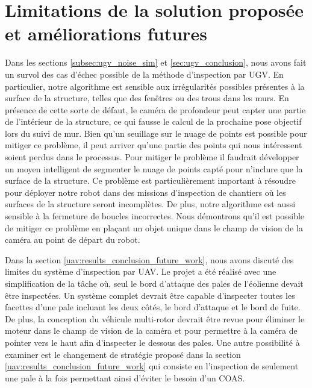\section{Limitations de la solution proposée et améliorations futures}\label{sec:Limitations}

Dans les sections \ref{subsec:ugv_noise_sim} et \ref{sec:ugv_conclusion}, nous avons fait un survol des cas d'échec possible de la méthode d'inspection par UGV. En particulier, notre algorithme est sensible aux irrégularités possibles présentes à la surface de la structure, telles que des fenêtres ou des trous dans les murs. En présence de cette sorte de défaut, le caméra de profondeur peut capter une partie de l'intérieur de la structure, ce qui fausse le calcul de la prochaine pose objectif lors du suivi de mur. Bien qu'un seuillage sur le nuage de points est possible pour mitiger ce problème, il peut arriver qu'une partie des points qui nous intéressent soient perdus dans le processus. Pour mitiger le problème il faudrait développer un moyen intelligent de segmenter le nuage de points capté pour n'inclure que la surface de la structure. Ce problème est particulièrement important à résoudre pour déployer notre robot dans des missions d'inspection de chantiers où les surfaces de la structure seront incomplètes. De plus, notre algorithme est aussi sensible à la fermeture de boucles incorrectes. Nous démontrons qu'il est possible de mitiger ce problème en plaçant un objet unique dans le champ de vision de la caméra au point de départ du robot.

Dans la section \ref{uav:results_conclusion_future_work}, nous avons discuté des limites du système d'inspection par UAV. Le projet a été réalisé avec une simplification de la tâche où, seul le bord d'attaque des pales de l'éolienne devait être inspectées. Un système complet devrait être capable d'inspecter toutes les facettes d'une pale incluant les deux côtés, le bord d'attaque et le bord de fuite. De plus, la conception du véhicule multi-rotor devrait être revue pour éliminer le moteur dans le champ de vision de la caméra et pour permettre à la caméra de pointer vers le haut afin d'inspecter le dessous des pales. Une autre possibilité à examiner est le changement de stratégie proposé dans la section \ref{uav:results_conclusion_future_work} qui consiste en l'inspection de seulement une pale à la fois permettant ainsi d'éviter le besoin d'un COAS.

